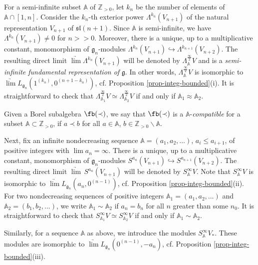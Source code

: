 \documentclass[12pt]{amsart}
\newcommand{\Z}{{\mathbb Z}}
\def\gg{\mathfrak{g}}
\def\Z{\mathbb{Z}}
\begin{document}
For a semi-infinite subset $\mathbb A$ of $\Z_{>0}$, let $k_n$ be the number of elements of  $\mathbb A \cap [1,n]$. Consider the $k_n$-th exterior power $\Lambda^{k_n} (V_{n+1})$ of the natural representation $V_{n+1}$ of $\mathfrak{sl}({n+1})$. Since $\mathbb A$ is semi-infinite, we have $\Lambda^{k_n} (V_{n+1}) \neq 0$ for $n>>0$. Moreover, there is a unique, up to a multiplicative constant, monomorphism of $\gg_n$-modules $\Lambda^{k_n} (V_{n+1}) \hookrightarrow \Lambda^{k_{n+1}} (V_{n+2})$. The resulting direct limit  $\underrightarrow\lim \Lambda^{k_n} (V_{n+1})$ will be denoted by $\Lambda_\mathbb A^{\frac{\infty}{2}}V$ and is a \emph{semi-infinite fundamental representation of} $\gg$. In other words, $\Lambda_\mathbb A^{\frac{\infty}{2}}V$ is isomorphic to $\underrightarrow\lim L_{\gg_n} (1^{(k_n)}, 0^{(n+1-k_n)})$, cf. Proposition \ref{prop-integ-bounded}(i). It is straightforward to check that  $\Lambda_{\mathbb A_1}^{\frac{\infty}{2}}V \simeq \Lambda_{\mathbb A_2}^{\frac{\infty}{2}}V$ if and only if $\mathbb A_1 \approx \mathbb A_2$.

 Given a Borel subalgebra $\fb(\prec)$, we say that $\fb(\prec)$ is a $\mathbb A$-\emph{compatible} for a subset $\mathbb A \subset \mathbb{Z}_{>0}$, if $a \prec b$ for all $a\in \mathbb A$, $b\in \mathbb{Z}_{>0}\backslash \mathbb A$. 


Next, fix an infinite nondecreasing sequence $\mathbb A=(a_1, a_2, \dots )$, $ a_i \leq a_{i+1} $, of positive integers with $\lim a_n = \infty$. There is a unique, up to a multiplicative constant, monomorphism of $\gg_n$-modules $S^{a_n} (V_{n+1}) \hookrightarrow S^{a_{n+1}} (V_{n+2})$. The resulting direct limit   $\underrightarrow\lim \,S^{a_n} (V_{n+1})$ will be denoted by  $S_{\mathbb A}^{\infty} V$. Note that $S_{\mathbb A}^{\infty} V$ is isomorphic to $\underrightarrow\lim L_{\gg_n} (a_n,0^{(n-1)})$, cf. Proposition \ref{prop-integ-bounded}(ii). For two  nondecreasing sequences of positive integers ${\mathbb A}_1 = (a_1,a_2,...)$ and ${\mathbb A}_2 = (b_1,b_2,...)$, we write ${\mathbb A}_1 \sim {\mathbb A}_2$ if $a_n=b_n$ for all $n$ greater than some $n_0$. 
It is straightforward to check  that $S_{\mathbb A_1}^{\infty} V \simeq S_{\mathbb A_2}^{\infty} V$ if and only if ${\mathbb A}_1 \sim {\mathbb A}_2$. 

Similarly, for a sequence ${\mathbb A}$ as above, we introduce the modules $S_{\mathbb A}^{\infty} V_*$.  These modules are isomorphic to  $\underrightarrow\lim L_{\gg_n} (0^{(n-1)}, -a_n)$, cf. Proposition \ref{prop-integ-bounded}(iii).
\end{document}
